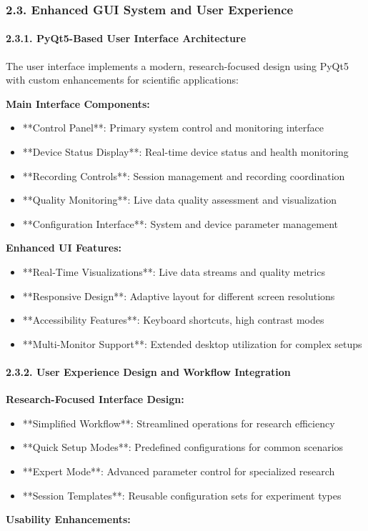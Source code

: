\documentclass[12pt,a4paper]{article}
\begin{document}
\subsubsection{2.3. Enhanced GUI System and User Experience}

\paragraph{2.3.1. PyQt5-Based User Interface Architecture}

The user interface implements a modern, research-focused design using PyQt5 with custom enhancements for scientific
applications:

\textbf{Main Interface Components:}

\begin{itemize}
\item **Control Panel**: Primary system control and monitoring interface
\item **Device Status Display**: Real-time device status and health monitoring
\item **Recording Controls**: Session management and recording coordination
\item **Quality Monitoring**: Live data quality assessment and visualization
\item **Configuration Interface**: System and device parameter management

\end{itemize}
\textbf{Enhanced UI Features:}

\begin{itemize}
\item **Real-Time Visualizations**: Live data streams and quality metrics
\item **Responsive Design**: Adaptive layout for different screen resolutions
\item **Accessibility Features**: Keyboard shortcuts, high contrast modes
\item **Multi-Monitor Support**: Extended desktop utilization for complex setups

\end{itemize}
\paragraph{2.3.2. User Experience Design and Workflow Integration}

\textbf{Research-Focused Interface Design:}

\begin{itemize}
\item **Simplified Workflow**: Streamlined operations for research efficiency
\item **Quick Setup Modes**: Predefined configurations for common scenarios
\item **Expert Mode**: Advanced parameter control for specialized research
\item **Session Templates**: Reusable configuration sets for experiment types

\end{itemize}
\textbf{Usability Enhancements:}
\end{document}
